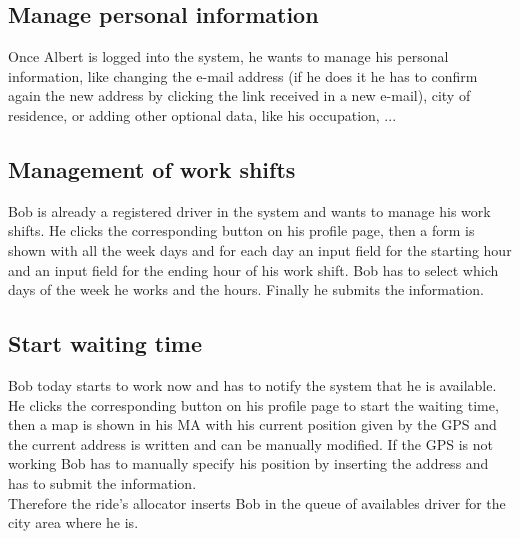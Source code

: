 \subsection{Manage personal information} 
Once Albert is logged into the system, he wants to manage his personal information, like changing the e-mail address (if he does it he has to confirm again the new address by clicking the link received in a new e-mail), city of residence, or adding other optional data, like his occupation, ...

\subsection{Management of work shifts}
Bob is already a registered driver in the system and wants to manage his work shifts. He clicks the corresponding button on his profile page, then a form is shown with all the week days and for each day an input field for the starting hour and an input field for the ending hour of his work shift. Bob has to select which days of the week he works and the hours. Finally he submits the information.

\subsection{Start waiting time}
Bob today starts to work now and has to notify the system that he is available. He clicks the corresponding button on his profile page to start the waiting time, then a map is shown in his MA with his current position given by the GPS and the current address is written and can be manually modified. If the GPS is not working Bob has to manually specify his position by inserting the address and has to submit the information.\\
Therefore the ride's allocator inserts Bob in the queue of availables driver for the city area where he is.

